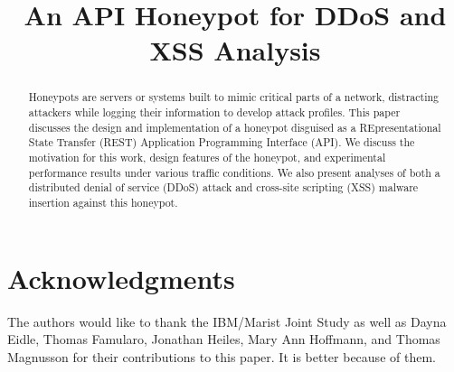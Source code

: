 \documentclass[10pt, conference]{IEEEtran}
\begin{document}
%
\title{An API Honeypot for DDoS and XSS Analysis}


\author{
}


\maketitle


\begin{abstract}
Honeypots are servers or systems built to mimic critical parts of a network, distracting attackers while logging their information to develop attack profiles. 
This paper discusses the design and implementation of a honeypot disguised as a REpresentational State Transfer (REST) Application Programming Interface (API). 
We discuss the motivation for this work, design features of the honeypot, and experimental performance results under various traffic conditions.  
We also present analyses of both a distributed denial of service (DDoS) attack and cross-site scripting (XSS) malware insertion against this honeypot.
\end{abstract}








\section*{Acknowledgments} \label{Acknowledgements}
The authors would like to thank the IBM/Marist Joint Study as well as Dayna Eidle, Thomas Famularo, Jonathan Heiles, Mary Ann Hoffmann, and Thomas Magnusson for their contributions to this paper. It is better because of them.
\end{document}
